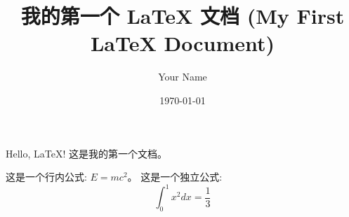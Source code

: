 \documentclass{ctexart} %
\begin{document}
\title{我的第一个 LaTeX 文档 (My First LaTeX Document)} %
\author{Your Name} %
\date{\today} %
\maketitle %

Hello, LaTeX! 这是我的第一个文档。 %

这是一个行内公式: $E=mc^2$。 
这是一个独立公式:
\[
\int_{0}^{1} x^2 dx = \frac{1}{3}
\]
\end{document}
